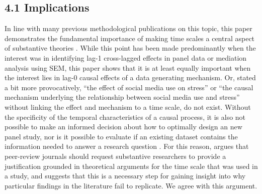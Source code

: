 \documentclass[man]{apa7} %
\begin{document}
\subsection{4.1 Implications}
In line with many previous methodological publications on this topic, this paper demonstrates the fundamental importance of making time scales a central aspect of substantive theories \parencite[cf.][]{hamaker_within-between_2023, mitchell_building_2001, dormann_optimal_2015, collins_effect_2002, driver_inference_2025}. While this point has been made predominantly when the interest was in identifying lag-1 cross-lagged effects in panel data or mediation analysis using SEM, this paper shows that it is at least equally important when the interest lies in lag-0 causal effects of a data generating mechanism. Or, stated a bit more provocatively, ``the effect of social media use on stress'' or ``the causal mechanism underlying the relationship between social media use and stress'' without linking the effect and mechanism to a time scale, do not exist. Without the specificity of the temporal characteristics of a causal process, it is also not possible to make an informed decision about how to optimally design an new panel study, nor is it possible to evaluate if an existing dataset contains the information needed to answer a research question \parencite{voelkle_role_2018}. For this reason, \textcite{collins_analysis_2006} argues that peer-review journals should request substantive researchers to provide a justification grounded in theoretical arguments for the time scale that was used in a study, and suggests that this is a necessary step for gaining insight into why particular findings in the literature fail to replicate. We agree with this argument. 
\end{document}
